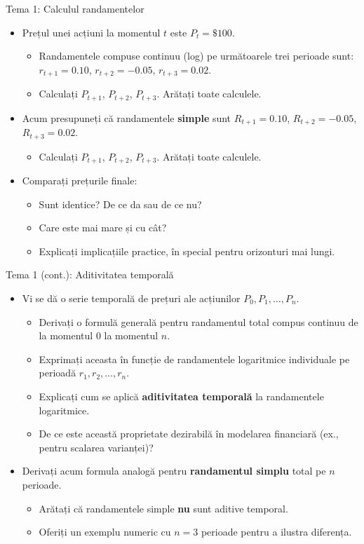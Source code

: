 \documentclass[9pt, aspectratio=169, t]{beamer}
\theoremstyle{definition}
\begin{document}
\begin{frame}{Tema 1: Calculul randamentelor}
\begin{itemize}
    \item Prețul unei acțiuni la momentul $t$ este $P_t = \$100$.
    \begin{itemize}
        \item Randamentele compuse continuu (log) pe următoarele trei perioade sunt:
        $r_{t+1} = 0.10$,\; $r_{t+2} = -0.05$,\; $r_{t+3} = 0.02$.
        \item Calculați $P_{t+1}$, $P_{t+2}$, $P_{t+3}$. Arătați toate calculele.
    \end{itemize}
    \item Acum presupuneți că randamentele \textbf{simple} sunt $R_{t+1} = 0.10$, $R_{t+2} = -0.05$, $R_{t+3} = 0.02$.
    \begin{itemize}
        \item Calculați $P_{t+1}$, $P_{t+2}$, $P_{t+3}$. Arătați toate calculele.
    \end{itemize}
    \item Comparați prețurile finale:
    \begin{itemize}
        \item Sunt identice? De ce da sau de ce nu?
        \item Care este mai mare și cu cât?
        \item Explicați implicațiile practice, în special pentru orizonturi mai lungi.
    \end{itemize}
\end{itemize}
\end{frame}

\begin{frame}{Tema 1 (cont.): Aditivitatea temporală}
\begin{itemize}
    \item Vi se dă o serie temporală de prețuri ale acțiunilor $P_0, P_1, \ldots, P_n$.
    \begin{itemize}
        \item Derivați o formulă generală pentru randamentul total compus continuu de la momentul $0$ la momentul $n$.
        \item Exprimați aceasta în funcție de randamentele logaritmice individuale pe perioadă $r_1, r_2, \ldots, r_n$.
        \item Explicați cum se aplică \textbf{aditivitatea temporală} la randamentele logaritmice.
        \item De ce este această proprietate dezirabilă în modelarea financiară (ex., pentru scalarea varianței)?
    \end{itemize}
    \item Derivați acum formula analogă pentru \textbf{randamentul simplu} total pe $n$ perioade.
    \begin{itemize}
        \item Arătați că randamentele simple \textbf{nu} sunt aditive temporal.
        \item Oferiți un exemplu numeric cu $n=3$ perioade pentru a ilustra diferența.
    \end{itemize}
\end{itemize}
\end{frame}
\end{document}
